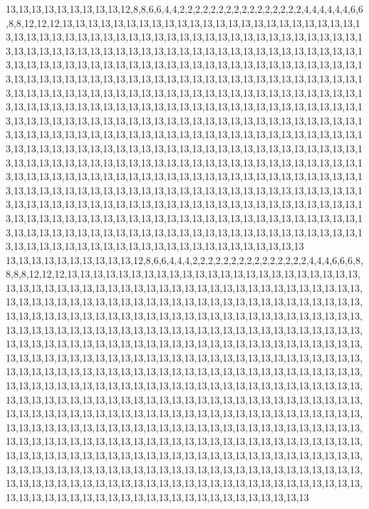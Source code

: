 13,13,13,13,13,13,13,13,13,12,8,8,6,6,4,4,2,2,2,2,2,2,2,2,2,2,2,2,2,2,2,2,4,4,4,4,4,4,6,6,8,8,12,12,12,13,13,13,13,13,13,13,13,13,13,13,13,13,13,13,13,13,13,13,13,13,13,13,13,13,13,13,13,13,13,13,13,13,13,13,13,13,13,13,13,13,13,13,13,13,13,13,13,13,13,13,13,13,13,13,13,13,13,13,13,13,13,13,13,13,13,13,13,13,13,13,13,13,13,13,13,13,13,13,13,13,13,13,13,13,13,13,13,13,13,13,13,13,13,13,13,13,13,13,13,13,13,13,13,13,13,13,13,13,13,13,13,13,13,13,13,13,13,13,13,13,13,13,13,13,13,13,13,13,13,13,13,13,13,13,13,13,13,13,13,13,13,13,13,13,13,13,13,13,13,13,13,13,13,13,13,13,13,13,13,13,13,13,13,13,13,13,13,13,13,13,13,13,13,13,13,13,13,13,13,13,13,13,13,13,13,13,13,13,13,13,13,13,13,13,13,13,13,13,13,13,13,13,13,13,13,13,13,13,13,13,13,13,13,13,13,13,13,13,13,13,13,13,13,13,13,13,13,13,13,13,13,13,13,13,13,13,13,13,13,13,13,13,13,13,13,13,13,13,13,13,13,13,13,13,13,13,13,13,13,13,13,13,13,13,13,13,13,13,13,13,13,13,13,13,13,13,13,13,13,13,13,13,13,13,13,13,13,13,13,13,13,13,13,13,13,13,13,13,13,13,13,13,13,13,13,13,13,13,13,13,13,13,13,13,13,13,13,13,13,13,13,13,13,13,13,13,13,13,13,13,13,13,13,13,13,13,13,13,13,13,13,13,13,13,13,13,13,13,13,13,13,13,13,13,13,13,13,13,13,13,13,13,13,13,13,13,13,13,13,13,13,13,13,13,13,13,13,13,13,13,13,13,13,13,13,13,13,13,13,13,13,13,13,13,13,13,13,13,13,13,13,13,13,13,13,13,13,13,13,13,13,13,13,13,13,13,13,13,13,13,13,13,13,13,13,13,13,13,13,13,13,13,13,13,13,13,13,13,13,13,13,13,13,13,13,13,13,13,13,13,13,13,13,13,13,13,13,13,13,13,13,13,13,13,13,13
13,13,13,13,13,13,13,13,13,13,12,8,6,6,4,4,4,2,2,2,2,2,2,2,2,2,2,2,2,2,2,2,4,4,4,6,6,6,8,8,8,8,12,12,12,13,13,13,13,13,13,13,13,13,13,13,13,13,13,13,13,13,13,13,13,13,13,13,13,13,13,13,13,13,13,13,13,13,13,13,13,13,13,13,13,13,13,13,13,13,13,13,13,13,13,13,13,13,13,13,13,13,13,13,13,13,13,13,13,13,13,13,13,13,13,13,13,13,13,13,13,13,13,13,13,13,13,13,13,13,13,13,13,13,13,13,13,13,13,13,13,13,13,13,13,13,13,13,13,13,13,13,13,13,13,13,13,13,13,13,13,13,13,13,13,13,13,13,13,13,13,13,13,13,13,13,13,13,13,13,13,13,13,13,13,13,13,13,13,13,13,13,13,13,13,13,13,13,13,13,13,13,13,13,13,13,13,13,13,13,13,13,13,13,13,13,13,13,13,13,13,13,13,13,13,13,13,13,13,13,13,13,13,13,13,13,13,13,13,13,13,13,13,13,13,13,13,13,13,13,13,13,13,13,13,13,13,13,13,13,13,13,13,13,13,13,13,13,13,13,13,13,13,13,13,13,13,13,13,13,13,13,13,13,13,13,13,13,13,13,13,13,13,13,13,13,13,13,13,13,13,13,13,13,13,13,13,13,13,13,13,13,13,13,13,13,13,13,13,13,13,13,13,13,13,13,13,13,13,13,13,13,13,13,13,13,13,13,13,13,13,13,13,13,13,13,13,13,13,13,13,13,13,13,13,13,13,13,13,13,13,13,13,13,13,13,13,13,13,13,13,13,13,13,13,13,13,13,13,13,13,13,13,13,13,13,13,13,13,13,13,13,13,13,13,13,13,13,13,13,13,13,13,13,13,13,13,13,13,13,13,13,13,13,13,13,13,13,13,13,13,13,13,13,13,13,13,13,13,13,13,13,13,13,13,13,13,13,13,13,13,13,13,13,13,13,13,13,13,13,13,13,13,13,13,13,13,13,13,13,13,13,13,13,13,13,13,13,13,13,13,13,13,13,13,13,13,13,13,13,13,13,13,13,13,13,13,13,13,13,13,13,13,13,13,13,13,13,13,13,13,13,13,13,13,13,13,13,13,13,13,13
